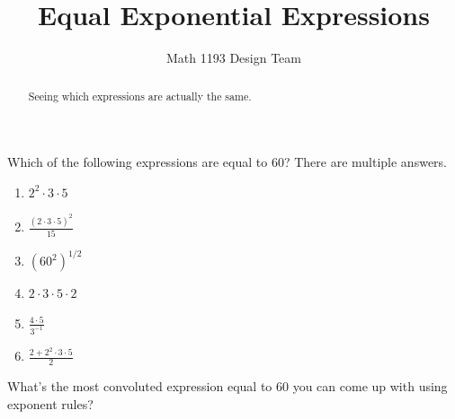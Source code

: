 \documentclass[noauthor]{ximera}
\title{Equal Exponential Expressions}
\author{Math 1193 Design Team}
\begin{document}
\begin{abstract}
    Seeing which expressions are actually the same.
\end{abstract}
\maketitle

Which of the following expressions are equal to 60? There are multiple
answers.

\begin{enumerate}
    \item \(2^2 \cdot 3 \cdot 5\)
    \item \(\frac{(2\cdot 3\cdot 5)^2}{15}\)
    \item \((60^2)^{1/2}\)
    \item \(2\cdot 3\cdot 5\cdot 2\)
    \item \(\frac{4\cdot 5}{3^{-1}}\)
    \item \(\frac{2 + 2^2 \cdot 3 \cdot 5}{2}\)
\end{enumerate}

What's the most convoluted expression equal to 60 you can come up
with using exponent rules?
\end{document}
